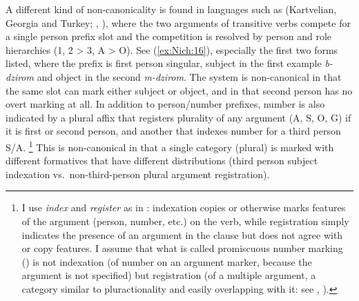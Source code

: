 \documentclass[output=collectionpaper]{langsci/langscibook}
\begin{document}
A different kind of non-canonicality is found in languages such as  (Kart\-ve\-lian, Georgia and Turkey; \citealt[283]{Lacroix2009}, \citealt[48]{Oeztuerk2011}), where the two arguments of transitive verbs compete for a single person prefix slot and the competition is resolved by person and role hierarchies (1, 2 > 3, A > O). See (\ref{ex:Nich:16}), especially the first two forms listed, where the prefix is first person singular, subject in the first example \textit{b-dzirom} and object in the second \textit{m-dzirom}. The system is non-canonical in that the same slot can mark either subject or object, and in that second person has no overt marking at all. In addition to person/number prefixes, number is also indicated by a plural affix that registers plurality of any argument (A, S, O, G) if it is first or second person, and another that indexes number for a third person S/A.%
\footnote{%
I use \textit{index} and \textit{register} as in \citet[48--49]{Nichols1992}: indexation copies or otherwise marks features of the argument (person, number, etc.\@) on the verb, while registration simply indicates the presence of an argument in the clause but does not agree with or copy features. I assume that what is called promiscuous number marking (\citealt{Leer1991}) is not indexation (of number on an argument marker, because the argument is not specified) but registration (of a multiple argument, a category similar to pluractionality and easily overlapping with it: see \citealt{Wood2007}, \citealt{Yu2003}).
} %
This is non-canonical in that a single category (plural) is marked with different formatives that have different distributions (third person subject indexation vs.\ non-third-person plural argument registration).

%
\end{document}
